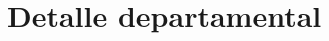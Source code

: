 \documentclass[12pt, a4paper]{article}
\begin{document}
\newpage
\tableofcontents
\newpage



\appendix
\section{Detalle departamental}


%
%
\end{document}
